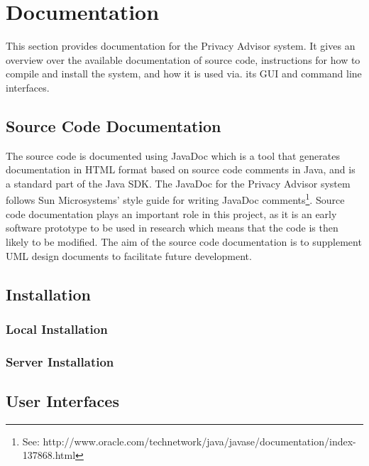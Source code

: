  

\chapter{Documentation}\label{doc}

\minitoc

This section provides documentation for the Privacy Advisor system. It gives an overview over the available documentation of source code, instructions for how to compile and install the system, and how it is used via. its GUI and command line interfaces.

\section{Source Code Documentation}

The source code is documented using JavaDoc which is 	a tool that generates documentation in HTML format based on source code comments in Java, and is a standard part of the Java SDK. The JavaDoc for the Privacy Advisor system follows Sun Microsystems' style guide for writing JavaDoc comments\footnote{See: http://www.oracle.com/technetwork/java/javase/documentation/index-137868.html}. Source code documentation plays an important role in this project, as it is an early software prototype to be used in research which means that the code is then likely to be modified. The aim of the source code documentation is to supplement UML design documents to facilitate future development.

\section{Installation}

\subsection{Local Installation}

\subsection{Server Installation}

\section{User Interfaces}

